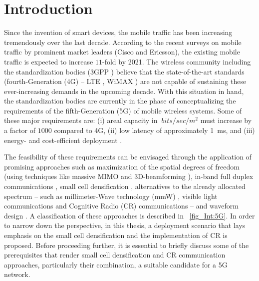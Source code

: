 \chapter{Introduction}
\label{chap:Int}

Since the invention of smart devices, the mobile traffic has been increasing tremendously over the last decade. According to the recent surveys on mobile traffic by prominent market leaders (Cisco \cite{CISCO14} and Ericsson\cite{Eric15}), the existing mobile traffic is expected to increase $11$-fold  by 2021. The wireless community including the standardization bodies (3GPP \cite{3GPP}) believe that the state-of-the-art standards (fourth-Generation (4G)  -- LTE , WiMAX ) are not capable of sustaining these ever-increasing demands in the upcoming decade. With this situation in hand, the standardization bodies are currently in the phase of conceptualizing the requirements of the fifth-Generation (5G)  of mobile wireless systems.
Some of these major requirements are: (i) areal capacity in $\SI{}{bits/sec/m^2}$ must increase by a factor of $1000$ compared to 4G, (ii) low latency of approximately \SI{1}{ms}, and (iii) energy- and cost-efficient deployment \cite{Qual13, Andrews14}.


The feasibility of these requirements can be envisaged through the application of promising approaches such as maximization of the spatial degrees of freedom (using techniques like massive MIMO \cite{Lar14} and 3D-beamforming \cite{Hal13}), in-band full duplex communications  \cite{Sab14}, small cell densification \cite{Andrews12, Gel13}, alternatives to the already allocated spectrum -- such as millimeter-Wave technology (mmW) \cite{Rapp13}, visible light communications \cite{Wu14} and Cognitive Radio (CR) communications -- and waveform design \cite{Scha14, Baz15}. A classification of these approaches is described in \figurename~\ref{fig_Int:5G}. In order to narrow down the perspective, in this thesis, a deployment scenario that lays emphasis on the small cell densification and the implementation of CR is proposed. Before proceeding further, it is essential to briefly discuss some of the prerequisites that render small cell densification and CR communication approaches, particularly their combination, a suitable candidate for a 5G network. 

